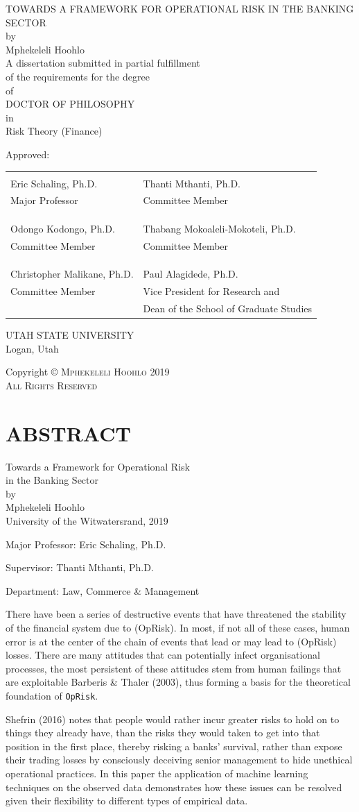 \documentclass{DissertateUSU}
\renewcommand{\maketitle}{
	\thispagestyle{empty}
	\vspace*{\fill}
	\begin{center}
	\doublespaced
	\MakeUppercase{Towards a Framework for Operational Risk in the Banking Sector}\\
	by\\
	Mphekeleli Hoohlo \\
	\singlespaced
	A dissertation submitted in partial fulfillment\\
	of the requirements for the degree \\
	\doublespaced
	of\\
	\MakeUppercase{Doctor of Philosophy} \\
	in\\
	\singlespaced
  Risk Theory (Finance) \\
	\end{center}

	\vspace{20pt}
	\noindent Approved: \\
	\vspace{30pt}
	\noindent
	\begin{tabular}{ll}
    \makebox[2.75in]{\hrulefill} & \makebox[2.75in]{\hrulefill}\\
    Eric Schaling, Ph.D.                      & Thanti Mthanti, Ph.D. \\
    Major Professor              & Committee Member \\
    & \\
    & \\
    \makebox[2.75in]{\hrulefill} & \makebox[2.75in]{\hrulefill}\\
    Odongo Kodongo, Ph.D.                 & Thabang Mokoaleli-Mokoteli, Ph.D. \\
    Committee Member             & Committee Member \\
    & \\
    & \\
    \makebox[2.75in]{\hrulefill} & \makebox[2.75in]{\hrulefill}\\
    Christopher Malikane, Ph.D.                 & Paul Alagidede, Ph.D. \\
    Committee Member             & Vice President for Research and \\
                                 & Dean of the School of Graduate Studies \\
    \end{tabular}

  \vspace{20pt}
    \begin{center}
	  \singlespacing
      UTAH STATE UNIVERSITY\\
	    Logan, Utah\\
	    \doublespacing
	    2019
	  \end{center}
	\vspace*{\fill}
	\clearpage
}
\newcommand{\copyrightpage}{
	\vspace*{\fill}
  \begin{center}
	\doublespacing
	Copyright \hspace{3pt}
	  \scshape \small \copyright  \hspace{3pt}
	  Mphekeleli Hoohlo \hspace{3pt} 2019 \\
	All Rights Reserved
  \end{center}
	\vspace*{\fill}
}
\begin{document}
\maketitle

\pagestyle{empty}
\copyrightpage


\newpage
\pagestyle{fancy}
\fancyhead[R]{\thepage}
\fancyfoot[C]{}
\chapter*{ABSTRACT}

\doublespacing
\begin{center}
Towards a Framework for Operational Risk \\ 
in the Banking Sector \\
\vspace{12pt}
by \\
\vspace{12pt}
Mphekeleli Hoohlo \\
University of the Witwatersrand, 2019
\end{center}

\vspace{12pt}

\singlespacing

\noindent Major Professor: Eric Schaling, Ph.D.

\noindent Supervisor: Thanti Mthanti, Ph.D.

\noindent Department: Law, Commerce \& Management

\vspace{12pt}

\doublespacing

There have been a series of destructive events that have threatened the
stability of the financial system due to (OpRisk). In most, if not all
of these cases, human error is at the center of the chain of events that
lead or may lead to (OpRisk) losses. There are many attitudes that can
potentially infect organisational processes, the most persistent of
these attitudes stem from human failings that are exploitable Barberis
\& Thaler (2003), thus forming a basis for the theoretical foundation of
\texttt{OpRisk}.

Shefrin (2016) notes that people would rather incur greater risks to
hold on to things they already have, than the risks they would taken to
get into that position in the first place, thereby risking a banks'
survival, rather than expose their trading losses by consciously
deceiving senior management to hide unethical operational practices. In
this paper the application of machine learning techniques on the
observed data demonstrates how these issues can be resolved given their
flexibility to different types of empirical data.
\end{document}
